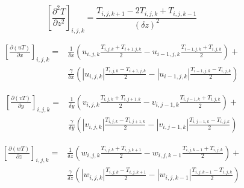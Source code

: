 \documentclass[10pt]{article}
\begin{document}
\begin{equation}
\left[\frac{\partial^2 T}{\partial z^2}\right]_{i,j,k} =
\frac{T_{i,j,k+1} - 2T_{i,j,k} + T_{i,j,k-1}}{(\delta z)^2}
\end{equation}

\begin{equation}
\begin{split}
\left[\frac{\partial(uT)}{\partial x}\right]_{i,j,k} = &
\frac{1}{\delta x}
\left(
	u_{i,j,k} \frac{T_{i,j,k}+T_{i+1,j,k}}{2} -
	u_{i-1,j,k} \frac{T_{i-1,j,k}+T_{i,j,k}}{2}
\right) + \\
& \frac{\gamma}{\delta x}
\left(
	|u_{i,j,k}| \frac{T_{i,j,k}-T_{i+1,j,k}}{2} -
	|u_{i-1,j,k}| \frac{T_{i-1,j,k}-T_{i,j,k}}{2}
\right)
\end{split}
\end{equation}

\begin{equation}
\begin{split}
\left[\frac{\partial(vT)}{\partial y}\right]_{i,j,k} = &
\frac{1}{\delta y}
\left(
	v_{i,j,k} \frac{T_{i,j,k}+T_{i,j+1,k}}{2} -
	v_{i,j-1,k} \frac{T_{i,j-1,k}+T_{i,j,k}}{2}
\right) + \\
& \frac{\gamma}{\delta y}
\left(
	|v_{i,j,k}| \frac{T_{i,j,k}-T_{i,j+1,k}}{2} -
	|v_{i,j-1,k}| \frac{T_{i,j-1,k}-T_{i,j,k}}{2}
\right)
\end{split}
\end{equation}

\begin{equation}
\begin{split}
\left[\frac{\partial(wT)}{\partial z}\right]_{i,j,k} = &
\frac{1}{\delta z}
\left(
	w_{i,j,k} \frac{T_{i,j,k}+T_{i,j,k+1}}{2} -
	w_{i,j,k-1} \frac{T_{i,j,k-1}+T_{i,j,k}}{2}
\right) + \\
& \frac{\gamma}{\delta z}
\left(
	|w_{i,j,k}| \frac{T_{i,j,k}-T_{i,j,k+1}}{2} -
	|w_{i,j,k-1}| \frac{T_{i,j,k-1}-T_{i,j,k}}{2}
\right)
\end{split}
\end{equation}
\end{document}
